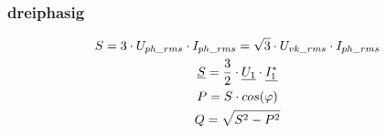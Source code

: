 \subsubsection{dreiphasig}
\begin{gather*}
S = 3 \cdot U_{ph\_rms} \cdot I_{ph\_rms} = \sqrt{3} \cdot U_{vk\_rms} \cdot I_{ph\_rms} \\
\underline{S} = \frac{3}{2} \cdot \underline{U_1} \cdot \underline{I_1^*} \\
P = S \cdot cos(\varphi) \\
Q = \sqrt{S^2 - P^2}
\end{gather*}
